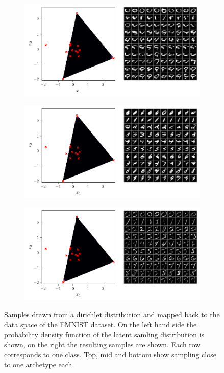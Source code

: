 \begin{figure}[htpb]
	\centering
	\begin{subfigure}[htpb]{\textwidth}
		\centering
		\includegraphics[width=1\linewidth]{figures/samples/aa_emnist1.pdf}
	\end{subfigure}

	\begin{subfigure}[htpb]{\textwidth}
		\centering
		\includegraphics[width=1\linewidth]{figures/samples/aa_emnist2.pdf}
	\end{subfigure}

	\begin{subfigure}[htpb]{\textwidth}
		\centering
		\includegraphics[width=1\linewidth]{figures/samples/aa_emnist3.pdf}
	\end{subfigure}
	\caption{Samples drawn from a dirichlet distribution and mapped back to
		the data space of the EMNIST dataset. On the left hand side the
		probability density function of the latent samling distribution is
		shown, on the right the resulting samples are shown. Each row
		corresponds to one class. Top, mid and bottom show sampling
		close to one archetype each.}%
	\label{fig:aa_emnist_corners}
\end{figure}

